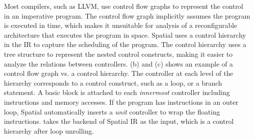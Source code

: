 Most compilers, such as LLVM, use control flow graphs to represent the control in an imperative program.
The control flow graph implicitly assumes the program is executed in time, which makes it unsuitable
for analysis of a reconfigurable architecture that executes the program in space. 
Spatial uses a control hierarchy in the IR to capture the scheduling of the program.
The control hierarchy uses a tree structure to represent the nested control constructs, making it
easier to analyze the relations between controllers.
 (b) and (c) shows an example of a control flow graph vs. a control hierarchy.
The controller at each level of the hierarchy corresponds to a control construct, such as a loop, or
a branch statement. 
A basic block is attached to each \emph{innermost} controller including instructions
and memory accesses.
If the program has instructions in an outer loop, Spatial automatically inserts a \emph{unit}
controller to wrap the floating instructions.
\name takes the backend of Spatial IR as the input, which is a control hierarchy after loop
unrolling.


